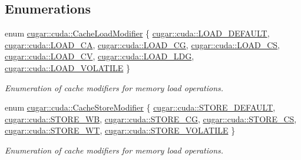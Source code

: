 \subsection*{Enumerations}
\begin{DoxyCompactItemize}
\item 
enum \hyperlink{group___c_u_d_a_module_ga6dd203ab0e1210c1f65dffe2427a8278}{cugar\+::cuda\+::\+Cache\+Load\+Modifier} \{ \newline
\hyperlink{group___c_u_d_a_module_gga6dd203ab0e1210c1f65dffe2427a8278a9fb064ccfa9e17ec57f6499e8f694244}{cugar\+::cuda\+::\+L\+O\+A\+D\+\_\+\+D\+E\+F\+A\+U\+LT}, 
\hyperlink{group___c_u_d_a_module_gga6dd203ab0e1210c1f65dffe2427a8278a479d804fcf98ca3b2dd434f18fc23f2b}{cugar\+::cuda\+::\+L\+O\+A\+D\+\_\+\+CA}, 
\hyperlink{group___c_u_d_a_module_gga6dd203ab0e1210c1f65dffe2427a8278ad0a3247417bd1a28c69ec4b8a929f266}{cugar\+::cuda\+::\+L\+O\+A\+D\+\_\+\+CG}, 
\hyperlink{group___c_u_d_a_module_gga6dd203ab0e1210c1f65dffe2427a8278aaa03240beed4535c68a00e26980fce93}{cugar\+::cuda\+::\+L\+O\+A\+D\+\_\+\+CS}, 
\newline
\hyperlink{group___c_u_d_a_module_gga6dd203ab0e1210c1f65dffe2427a8278a28473aba30784b79e03f14cc8a5a0ea2}{cugar\+::cuda\+::\+L\+O\+A\+D\+\_\+\+CV}, 
\hyperlink{group___c_u_d_a_module_gga6dd203ab0e1210c1f65dffe2427a8278a94ad6ec0148ed162df83ea7b6499ecea}{cugar\+::cuda\+::\+L\+O\+A\+D\+\_\+\+L\+DG}, 
\hyperlink{group___c_u_d_a_module_gga6dd203ab0e1210c1f65dffe2427a8278abc7e98479e284450d4853b9f74349b04}{cugar\+::cuda\+::\+L\+O\+A\+D\+\_\+\+V\+O\+L\+A\+T\+I\+LE}
 \}\begin{DoxyCompactList}\small\item\em Enumeration of cache modifiers for memory load operations. \end{DoxyCompactList}
\item 
enum \hyperlink{group___c_u_d_a_module_ga66c87645c20c37932d6a02fcb57eebea}{cugar\+::cuda\+::\+Cache\+Store\+Modifier} \{ \newline
\hyperlink{group___c_u_d_a_module_gga66c87645c20c37932d6a02fcb57eebeaac5849707f20e889247a639bc0d044fb4}{cugar\+::cuda\+::\+S\+T\+O\+R\+E\+\_\+\+D\+E\+F\+A\+U\+LT}, 
\hyperlink{group___c_u_d_a_module_gga66c87645c20c37932d6a02fcb57eebeaa46d83271d0278d18d62e1aeace08b708}{cugar\+::cuda\+::\+S\+T\+O\+R\+E\+\_\+\+WB}, 
\hyperlink{group___c_u_d_a_module_gga66c87645c20c37932d6a02fcb57eebeaa2b116f50bd3fb867e2415dc1bb9b9372}{cugar\+::cuda\+::\+S\+T\+O\+R\+E\+\_\+\+CG}, 
\hyperlink{group___c_u_d_a_module_gga66c87645c20c37932d6a02fcb57eebeaa32ccc51c7222b2934223725205626801}{cugar\+::cuda\+::\+S\+T\+O\+R\+E\+\_\+\+CS}, 
\newline
\hyperlink{group___c_u_d_a_module_gga66c87645c20c37932d6a02fcb57eebeaac9e9673aa392e6201825fb78f1dc338d}{cugar\+::cuda\+::\+S\+T\+O\+R\+E\+\_\+\+WT}, 
\hyperlink{group___c_u_d_a_module_gga66c87645c20c37932d6a02fcb57eebeaa3e5003613374672c2dd6956dab94972b}{cugar\+::cuda\+::\+S\+T\+O\+R\+E\+\_\+\+V\+O\+L\+A\+T\+I\+LE}
 \}\begin{DoxyCompactList}\small\item\em Enumeration of cache modifiers for memory load operations. \end{DoxyCompactList}
\end{DoxyCompactItemize}
